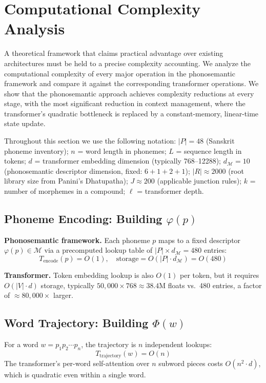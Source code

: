 \documentclass[12pt]{article}
\begin{document}
\section{Computational Complexity Analysis}
\label{sec:complexity}

A theoretical framework that claims practical advantage over existing architectures must be held to a precise complexity accounting. We analyze the computational complexity of every major operation in the phonosemantic framework and compare it against the corresponding transformer operations. We show that the phonosemantic approach achieves complexity reductions at every stage, with the most significant reduction in context management, where the transformer's quadratic bottleneck is replaced by a constant-memory, linear-time state update.

Throughout this section we use the following notation: $|P| = 48$ (Sanskrit phoneme inventory); $n$ = word length in phonemes; $L$ = sequence length in tokens; $d$ = transformer embedding dimension (typically 768--12288); $d_\mathcal{M} = 10$ (phonosemantic descriptor dimension, fixed: $6 + 1 + 2 + 1$); $|R| \approx 2000$ (root library size from Panini's Dhatupatha); $J \approx 200$ (applicable junction rules); $k$ = number of morphemes in a compound; $\ell$ = transformer depth.

\subsection{Phoneme Encoding: Building $\varphi(p)$}

\textbf{Phonosemantic framework.}
Each phoneme $p$ maps to a fixed descriptor $\varphi(p) \in \mathcal{M}$ via a precomputed lookup table of $|P| \times d_\mathcal{M} = 480$ entries:
\[
T_\text{encode}(p) = O(1), \quad \text{storage} = O(|P| \cdot d_\mathcal{M}) = O(480)
\]

\textbf{Transformer.}
Token embedding lookup is also $O(1)$ per token, but it requires $O(|V| \cdot d)$ storage, typically $50{,}000 \times 768 \approx 38.4\text{M}$ floats vs.\ 480 entries, a factor of $\approx 80{,}000\times$ larger.

\subsection{Word Trajectory: Building $\Phi(w)$}

For a word $w = p_1 p_2 \cdots p_n$, the trajectory is $n$ independent lookups:
\[
T_\text{trajectory}(w) = O(n)
\]
The transformer's per-word self-attention over $n$ subword pieces costs $O(n^2 \cdot d)$, which is quadratic even within a single word.
\end{document}
